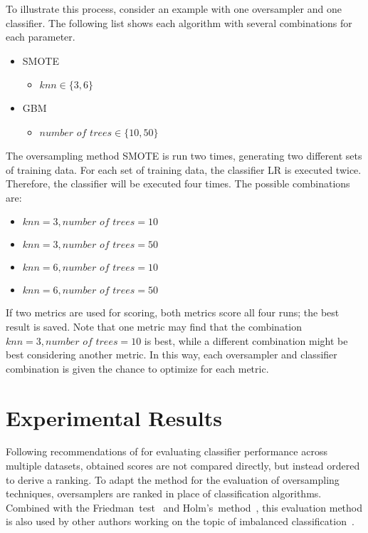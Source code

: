 \documentclass[sort&compress]{elsarticle}
\begin{document}
	To illustrate this process, consider an example with one oversampler and one
	classifier. The following list shows each algorithm with several
	combinations for each parameter.
	\begin{itemize}
		\item \ac{SMOTE}
		\begin{itemize}
			\item $knn \in \{3, 6\}$
		\end{itemize}
		\item \ac{GBM}
		\begin{itemize}
			\item $\textit{number of trees} \in \{10, 50\}$
		\end{itemize}
	\end{itemize}
	The oversampling method \ac{SMOTE} is run two times, generating two
	different sets of training data. For each set of training data, the
	classifier \ac{LR} is executed twice. Therefore, the classifier will be
	executed four times. The possible combinations are:
	\begin{itemize}
		\item $knn = 3, \textit{number of trees} = 10$
		\item $knn = 3, \textit{number of trees} = 50$
		\item $knn = 6, \textit{number of trees} = 10$
		\item $knn = 6, \textit{number of trees} = 50$
	\end{itemize}
	If two metrics are used for scoring, both metrics score all four runs; the
	best result is saved. Note that one metric may find that the combination
	$knn = 3, \textit{number of trees} = 10$ is best, while a different
	combination might be best considering another metric. In this way, each
	oversampler and classifier combination is given the chance to optimize for
	each metric.
    
\section{Experimental Results}
\label{sec:experimental-results}

Following recommendations of \citet{Demsar.2006} for evaluating classifier
performance across multiple datasets, obtained scores are not compared directly,
but instead ordered to derive a ranking. To adapt the method for the evaluation
of oversampling techniques, oversamplers are ranked in place of classification
algorithms. Combined with the Friedman~test~\citep{Friedman.1937} and
Holm's~method~\citep{Holm.1979}, this evaluation method is also used by other
authors working on the topic of imbalanced
classification~\citep{Cieslak.2012,Rivera.2017,Galar.2016}.
\end{document}
